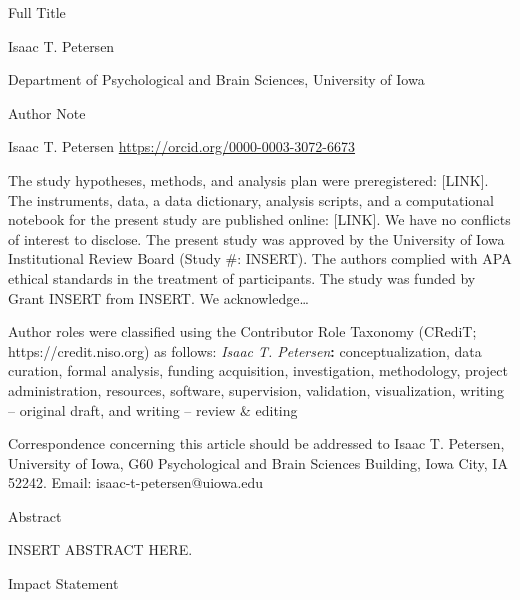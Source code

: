 \documentclass[
  american,
  letterpaper,
  12pt]{article}
\author{Isaac T. Petersen}
\date{}
\newcommand{\apatitle}[1]{%
  {\centering\bfseries #1\par}}
\newcommand{\apatitlepageheading}[1]{%
  {\centering\bfseries #1\par}}
\begin{document}
\hfill\break

\hfill\break

\vspace*{3\baselineskip}

\apatitle{

Full Title

}

\hfill\break

Isaac T. Petersen

Department of Psychological and Brain Sciences, University of Iowa

\hfill\break

\hfill\break

\apatitlepageheading{

Author Note

}

Isaac T. Petersen 
\url{https://orcid.org/0000-0003-3072-6673}

The study hypotheses, methods, and analysis plan were preregistered:
{[}LINK{]}. The instruments, data, a data dictionary, analysis scripts,
and a computational notebook for the present study are published online:
{[}LINK{]}. We have no conflicts of interest to disclose. The present
study was approved by the University of Iowa Institutional Review Board
(Study \#: INSERT). The authors complied with APA ethical standards in
the treatment of participants. The study was funded by Grant INSERT from
INSERT. We acknowledge\ldots{}

Author roles were classified using the Contributor Role Taxonomy
(CRediT; https://credit.niso.org) as follows: \emph{Isaac T.
Petersen}\textbf{: }conceptualization, data curation, formal analysis, funding acquisition, investigation, methodology, project administration, resources, software, supervision, validation, visualization, writing -- original draft, and writing -- review \& editing

Correspondence concerning this article should be addressed to Isaac T.
Petersen, University of Iowa, G60 Psychological and Brain Sciences
Building, Iowa City, IA 52242. Email: isaac-t-petersen@uiowa.edu

\clearpage

\apatitlepageheading{

Abstract

}

INSERT ABSTRACT HERE.

\apatitlepageheading{

Impact Statement

}
\end{document}
